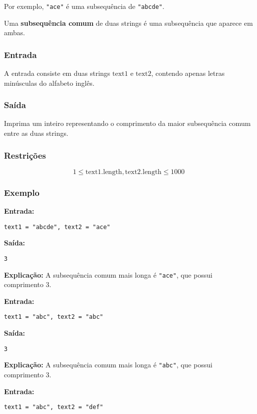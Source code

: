 Por exemplo, \texttt{"ace"} é uma subsequência de \texttt{"abcde"}.

Uma \textbf{subsequência comum} de duas strings é uma subsequência que aparece em ambas.

\subsubsection*{Entrada}
A entrada consiste em duas strings \( \text{text1} \) e \( \text{text2} \), contendo apenas letras minúsculas do alfabeto inglês.

\subsubsection*{Saída}
Imprima um inteiro representando o comprimento da maior subsequência comum entre as duas strings.

\subsubsection*{Restrições}
\[
1 \leq \text{text1.length}, \text{text2.length} \leq 1000
\]

\subsubsection*{Exemplo}

\textbf{Entrada:}
\begin{verbatim}
text1 = "abcde", text2 = "ace"
\end{verbatim}

\textbf{Saída:}
\begin{verbatim}
3
\end{verbatim}

\textbf{Explicação:} A subsequência comum mais longa é \texttt{"ace"}, que possui comprimento 3.

\bigskip
\textbf{Entrada:}
\begin{verbatim}
text1 = "abc", text2 = "abc"
\end{verbatim}

\textbf{Saída:}
\begin{verbatim}
3
\end{verbatim}

\textbf{Explicação:} A subsequência comum mais longa é \texttt{"abc"}, que possui comprimento 3.

\bigskip
\textbf{Entrada:}
\begin{verbatim}
text1 = "abc", text2 = "def"
\end{verbatim}

